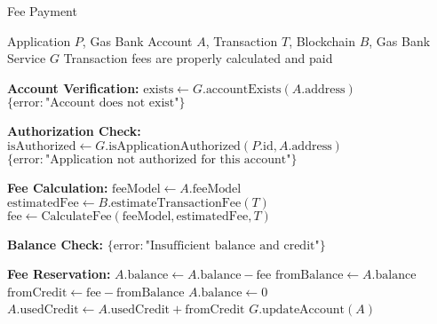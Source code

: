 \begin{tcolorbox}
\begin{tcolorbox}
\begin{tcolorbox}[
    enhanced,
    colback=blue!5!white,
    colframe=blue!75!black,
    arc=5mm,
    boxrule=1.5pt,
    title=Gas Bank Protocol,
    fonttitle=\bfseries,
    coltitle=white,
    attach boxed title to top left={yshift=-2mm, xshift=5mm},
    boxed title style={colback=blue!75!black, rounded corners},
    shadow={2mm}{-2mm}{0mm}{black!50},
    drop fuzzy shadow
]
\begin{tcolorbox}[
    enhanced,
    colback=blue!5!white,
    colframe=blue!75!black,
    arc=5mm,
    boxrule=1.5pt,
    title=Protocol,
    fonttitle=\bfseries,
    coltitle=white,
    attach boxed title to top left={yshift=-2mm, xshift=5mm},
    boxed title style={colback=blue!75!black, rounded corners},
    shadow={2mm}{-2mm}{0mm}{black!50},
    drop fuzzy shadow
]
\begin{protocol}{Fee Payment}
\label{prot:fee-payment}
\begin{algorithmic}[1]
\Require Application $P$, Gas Bank Account $A$, Transaction $T$, Blockchain $B$, Gas Bank Service $G$
\Ensure Transaction fees are properly calculated and paid

\State \textbf{Account Verification:}
\State $\text{exists} \gets G.\text{accountExists}(A.\text{address})$
    \State \Return $\{\text{error}: \text{"Account does not exist"}\}$
\EndIf

\State \textbf{Authorization Check:}
\State $\text{isAuthorized} \gets G.\text{isApplicationAuthorized}(P.\text{id}, A.\text{address})$
    \State \Return $\{\text{error}: \text{"Application not authorized for this account"}\}$
\EndIf

\State \textbf{Fee Calculation:}
\State $\text{feeModel} \gets A.\text{feeModel}$
\State $\text{estimatedFee} \gets B.\text{estimateTransactionFee}(T)$
\State $\text{fee} \gets \text{CalculateFee}(\text{feeModel}, \text{estimatedFee}, T)$

\State \textbf{Balance Check:}
    \State \Return $\{\text{error}: \text{"Insufficient balance and credit"}\}$
\EndIf

\State \textbf{Fee Reservation:}
    \State $A.\text{balance} \gets A.\text{balance} - \text{fee}$
\Else
    \State $\text{fromBalance} \gets A.\text{balance}$
    \State $\text{fromCredit} \gets \text{fee} - \text{fromBalance}$
    \State $A.\text{balance} \gets 0$
    \State $A.\text{usedCredit} \gets A.\text{usedCredit} + \text{fromCredit}$
\EndIf
\State $G.\text{updateAccount}(A)$


\end{algorithmic}
\end{protocol}
\end{tcolorbox}
\end{tcolorbox}
\end{tcolorbox}
\end{tcolorbox}
